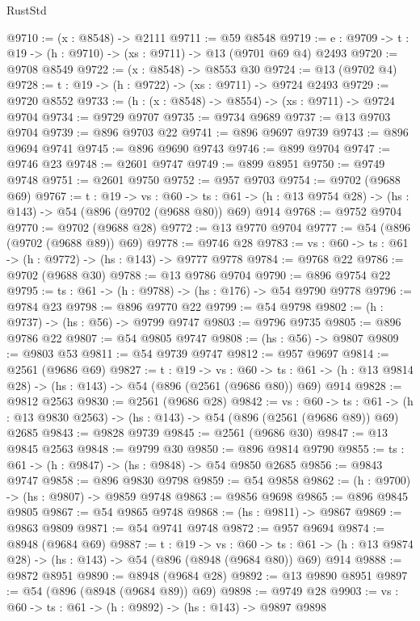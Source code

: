 \begin{lexlean}{RustStd}
\begin{coremodule}
@9710 := (x : @8548) -> @2111
@9711 := @59 @8548
@9719 := {e : @9709} -> {t : @19} -> (h : @9710) -> (xs : @9711) -> @13 (@9701 @69 @4) @2493
@9720 := @9708 @8549
@9722 := (x : @8548) -> @8553 @30
@9724 := @13 (@9702 @4)
@9728 := {t : @19} -> (h : @9722) -> (xs : @9711) -> @9724 @2493
@9729 := @9720 @8552
@9733 := (h : (x : @8548) -> @8554) -> (xs : @9711) -> @9724 @9704
@9734 := @9729 @9707
@9735 := @9734 @9689
@9737 := @13 @9703 @9704
@9739 := @896 @9703 @22
@9741 := @896 @9697 @9739
@9743 := @896 @9694 @9741
@9745 := @896 @9690 @9743
@9746 := @899 @9704
@9747 := @9746 @23
@9748 := @2601 @9747
@9749 := @899 @8951
@9750 := @9749 @9748
@9751 := @2601 @9750
@9752 := @957 @9703
@9754 := @9702 (@9688 @69)
@9767 := {t : @19} ->
  {vs : @60} ->
  {ts : @61} -> (h : @13 @9754 @28) -> (hs : @143) -> @54 (@896 (@9702 (@9688 @80)) @69) @914
@9768 := @9752 @9704
@9770 := @9702 (@9688 @28)
@9772 := @13 @9770 @9704
@9777 := @54 (@896 (@9702 (@9688 @89)) @69)
@9778 := @9746 @28
@9783 := {vs : @60} -> {ts : @61} -> (h : @9772) -> (hs : @143) -> @9777 @9778
@9784 := @9768 @22
@9786 := @9702 (@9688 @30)
@9788 := @13 @9786 @9704
@9790 := @896 @9754 @22
@9795 := {ts : @61} -> (h : @9788) -> (hs : @176) -> @54 @9790 @9778
@9796 := @9784 @23
@9798 := @896 @9770 @22
@9799 := @54 @9798
@9802 := (h : @9737) -> (hs : @56) -> @9799 @9747
@9803 := @9796 @9735
@9805 := @896 @9786 @22
@9807 := @54 @9805 @9747
@9808 := (hs : @56) -> @9807
@9809 := @9803 @53
@9811 := @54 @9739 @9747
@9812 := @957 @9697
@9814 := @2561 (@9686 @69)
@9827 := {t : @19} ->
  {vs : @60} ->
  {ts : @61} -> (h : @13 @9814 @28) -> (hs : @143) -> @54 (@896 (@2561 (@9686 @80)) @69) @914
@9828 := @9812 @2563
@9830 := @2561 (@9686 @28)
@9842 := {vs : @60} ->
  {ts : @61} -> (h : @13 @9830 @2563) -> (hs : @143) -> @54 (@896 (@2561 (@9686 @89)) @69) @2685
@9843 := @9828 @9739
@9845 := @2561 (@9686 @30)
@9847 := @13 @9845 @2563
@9848 := @9799 @30
@9850 := @896 @9814 @9790
@9855 := {ts : @61} -> (h : @9847) -> (hs : @9848) -> @54 @9850 @2685
@9856 := @9843 @9747
@9858 := @896 @9830 @9798
@9859 := @54 @9858
@9862 := (h : @9700) -> (hs : @9807) -> @9859 @9748
@9863 := @9856 @9698
@9865 := @896 @9845 @9805
@9867 := @54 @9865 @9748
@9868 := (hs : @9811) -> @9867
@9869 := @9863 @9809
@9871 := @54 @9741 @9748
@9872 := @957 @9694
@9874 := @8948 (@9684 @69)
@9887 := {t : @19} ->
  {vs : @60} ->
  {ts : @61} -> (h : @13 @9874 @28) -> (hs : @143) -> @54 (@896 (@8948 (@9684 @80)) @69) @914
@9888 := @9872 @8951
@9890 := @8948 (@9684 @28)
@9892 := @13 @9890 @8951
@9897 := @54 (@896 (@8948 (@9684 @89)) @69)
@9898 := @9749 @28
@9903 := {vs : @60} -> {ts : @61} -> (h : @9892) -> (hs : @143) -> @9897 @9898

\end{coremodule}
\end{lexlean}
